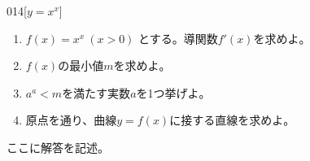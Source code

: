 \begin{thm}{014}{}{[$y=x^x$]}
 \begin{enumerate}
  \item $f(x)=x^x~(x>0)$ とする。導関数$f'(x)$を求めよ。
  \item $f(x)$の最小値$m$を求めよ。
  \item $a^a < m$を満たす実数$a$を1つ挙げよ。
  \item 原点を通り、曲線$y=f(x)$に接する直線を求めよ。
 \end{enumerate}
\end{thm}

ここに解答を記述。